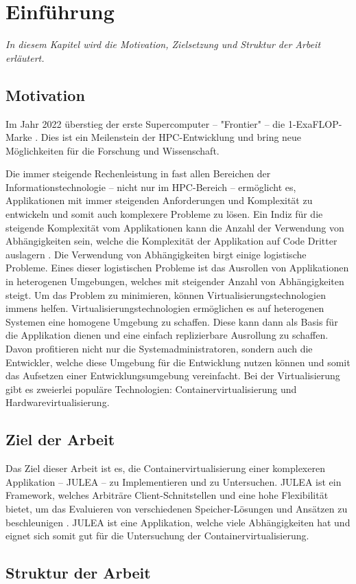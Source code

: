 \chapter{Einführung}
\label{cha:introduction}

\textit{In diesem Kapitel wird die Motivation, Zielsetzung und Struktur der Arbeit erläutert.}


\section{Motivation}
Im Jahr 2022 überstieg der erste Supercomputer – "Frontier" – die 1-ExaFLOP-Marke \cite[Vgl. 567ff]{rajaramanFrontierWorldsFirst2023}. Dies ist ein Meilenstein der HPC-Entwicklung und bring neue Möglichkeiten für die Forschung und Wissenschaft.

Die immer steigende Rechenleistung in fast allen Bereichen der Informationstechnologie – nicht nur im HPC-Bereich – ermöglicht es, Applikationen mit immer steigenden Anforderungen und Komplexität zu entwickeln und somit auch komplexere Probleme zu lösen. Ein Indiz für die steigende Komplexität vom Applikationen kann die Anzahl der Verwendung von Abhängigkeiten sein, welche die Komplexität der Applikation auf Code Dritter auslagern \cite[Vgl. Abbildung 2.4]{2024StateSoftware}. Die Verwendung von Abhängigkeiten birgt einige logistische Probleme. Eines dieser logistischen Probleme ist das Ausrollen von Applikationen in heterogenen Umgebungen, welches mit steigender Anzahl von Abhängigkeiten steigt. Um das Problem zu minimieren, können Virtualisierungstechnologien immens helfen. Virtualisierungstechnologien ermöglichen es auf heterogenen Systemen eine homogene Umgebung zu schaffen. Diese kann dann als Basis für die Applikation dienen und eine einfach replizierbare Ausrollung zu schaffen. Davon profitieren nicht nur die Systemadministratoren, sondern auch die Entwickler, welche diese Umgebung für die Entwicklung nutzen können und somit das Aufsetzen einer Entwicklungsumgebung vereinfacht. Bei der Virtualisierung gibt es zweierlei populäre Technologien: Containervirtualisierung und Hardwarevirtualisierung. 

\section{Ziel der Arbeit}

Das Ziel dieser Arbeit ist es, die Containervirtualisierung einer komplexeren Applikation – JULEA – zu Implementieren und zu Untersuchen. JULEA \cite{kuhnJULEAFlexibleStorage2017} ist ein Framework, welches Arbiträre Client-Schnitstellen und eine hohe Flexibilität bietet, um das Evaluieren von verschiedenen Speicher-Lösungen und Ansätzen zu beschleunigen \cite[Vgl. 1]{kuhnJULEAFlexibleStorage2017}. JULEA ist eine Applikation, welche viele Abhängigkeiten hat und eignet sich somit gut für die Untersuchung der Containervirtualisierung.

\section{Struktur der Arbeit}


